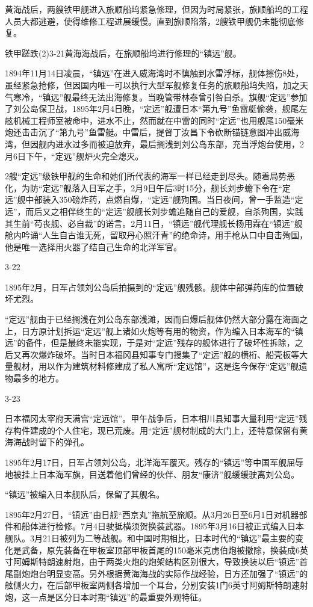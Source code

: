 \documentclass[12pt,UTF8]{ctexbook}
\begin{document}
黄海战后，两艘铁甲舰进入旅顺船坞紧急修理，但因为时局紧张，旅顺船坞的工程人员大都逃避，使得维修工程进展缓慢。直到旅顺陷落，2艘铁甲舰仍未能彻底修复。

铁甲蹉跌(2)3-21黄海海战后，在旅顺船坞进行修理的“镇远”舰。

1894年11月14日凌晨，“镇远”在进入威海湾时不慎触到水雷浮标，舰体擦伤8处，虽经紧急抢修，但因国内唯一可以执行大型军舰修复任务的旅顺船坞失陷，加之天气寒冷，“镇远”舰最终无法出海修复。当晚管带林泰曾引咎自杀。旗舰“定远”参加了刘公岛保卫战，1895年2月4日晚，“定远”舰遭日本“第九号”鱼雷艇偷袭，舰尾左舷机械工程师室被命中，进水不止，然而就在中雷的同时“定远”也用舰尾150毫米炮还击击沉了“第九号”鱼雷艇。中雷后，提督丁汝昌下令砍断锚链意图冲出威海湾，但因舰内进水过多而被迫放弃，最后搁浅到刘公岛东部，充当浮炮台使用，2月6日下午，“定远”舰炉火完全熄灭。

2艘“定远”级铁甲舰的生命和她们所代表的海军一样已经走到尽头。随着局势恶化，为防“定远”舰落入日军之手，2月9日午后3时15分，舰长刘步蟾下令在“定远”舰中部装入350磅炸药，点燃自爆，“定远”舰殉国。当日夜间，曾一手监造“定远”，而后又之相伴终生的“定远”舰舰长刘步蟾追随自己的爱舰，自杀殉国，实践其生前“苟丧舰、必自裁”的诺言。2月11日，“镇远”舰代理舰长杨用霖在“镇远”舰舱内吟诵“人生自古谁无死，留取丹心照汗青”的绝命诗，用手枪从口中自击殉国，他是唯一选择用火器了结自己生命的北洋军官。

3-22

1895年2月，日军占领刘公岛后拍摄到的“定远”舰残骸。舰体中部弹药库的位置破坏尤烈。

“定远”舰由于已经搁浅在刘公岛东部浅滩，因而自爆后舰体仍然大部分露在海面之上，日方原计划拆运“定远”舰上诸如火炮等有用的物资，作为编入日本海军的“镇远”的备件，但是最终未能实现，于是对“定远”残存的舰体进行了破坏性拆除，之后又再次爆炸破坏。当时日本福冈县知事专门搜集了“定远”舰的横桁、船壳板等大量舰材，用以作为建筑材料修建成了私人寓所“定远馆”，这是迄今保存“定远”舰遗物最多的地方。

3-23

日本福冈太宰府天满宫“定远馆”。甲午战争后，日本相川县知事大量利用“定远”残存构件建成的个人住宅，现已荒废。用“定远”舰材制成的大门上，还特意保留有黄海海战时留下的弹孔。

1895年2月17日，日军占领刘公岛，北洋海军覆灭。残存的“镇远”等中国军舰屈辱地被挂上日本海军旗，目送着他们曾经的伙伴、朋友“康济”舰缓缓驶离刘公岛。

“镇远”被编入日本舰队后，保留了其舰名。

1895年2月27日，“镇远”由日舰“西京丸”拖航至旅顺。从3月26日至6月1日对机器部件和船体进行检修。7月4日驶抵横须贺换装武器。1895年3月16日被正式编入日本舰队。3月21日被列为二等战舰。和中国时期相比，日本时代的“镇远”最主要的变化是武备，原先装备在甲板室顶部甲板首尾的150毫米克虏伯炮被撤除，换装成6英寸阿姆斯特朗速射炮，由于两类火炮的炮架结构区别很大，导致换装以后“镇远”首尾副炮炮台明显变高。另外根据黄海海战的实际作战经验，日方还加强了“镇远”的舷侧火力，在后部甲板室两侧各增加一个耳台，分别安装1门6英寸阿姆斯特朗速射炮，这一点是区分日本时期“镇远”的最重要外观特征。
\end{document}
